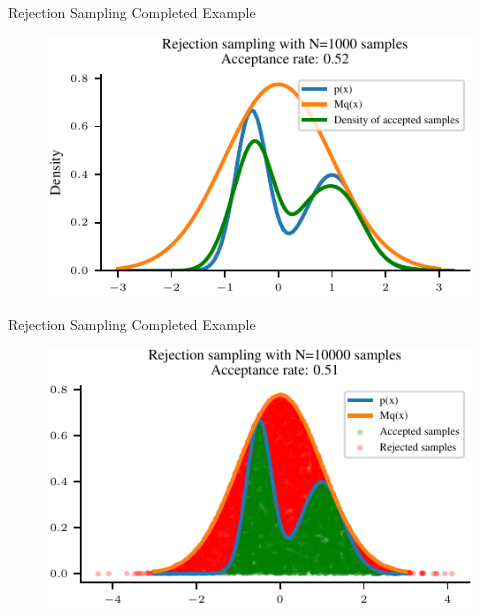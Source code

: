 \documentclass[handout]{beamer}
\begin{document}
    \begin{frame}{Rejection Sampling Completed Example}
        \begin{figure}
            \centering
            \includegraphics{notebooks/figures/sampling/rejection-sampling-N1000-True.pdf}
        \end{figure}
    \end{frame}

    \begin{frame}{Rejection Sampling Completed Example}
        \begin{figure}
            \centering
            \includegraphics{notebooks/figures/sampling/rejection-sampling-N10000-False.pdf}
        \end{figure}
    \end{frame}
\end{document}
